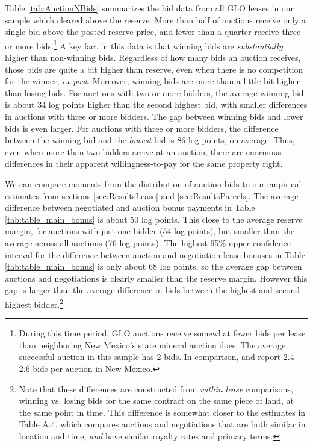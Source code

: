 \documentclass[12pt]{article}
\newcommand{\inputy}[1]{\unskip}
\begin{document}
Table \ref{tab:AuctionNBids} summarizes the bid data from all \inputy{../output/estimates/tract_date_leased_insample.tex} GLO leases in our sample which cleared above the reserve. More than half of auctions receive only a single bid above the posted reserve price, and fewer than a quarter receive three or more bids.\footnote{During this time period, GLO auctions receive somewhat fewer bids per lease than neighboring New Mexico's state mineral auction does. The average successful auction in this sample has 2 bids.  In comparison, \cite{bhattacharya2018bidding} and \cite{kong_selective_2017} report 2.4 - 2.6 bids per auction in New Mexico.}  A key fact in this data is that winning bids are \textit{substantially} higher than non-winning bids.  Regardless of how many bids an auction receives, those bids are quite a bit higher than reserve, even when there is no competition for the winner, \textit{ex post}.  Moreover, winning bids are more than a little bit higher than losing bids.  For auctions with two or more bidders, the average winning bid is about 34 log points higher than the second highest bid, with smaller differences in auctions with three or more bidders.  The gap between winning bids and lower bids is even larger.  For auctions with three or more bidders, the difference between the winning bid and the \textit{lowest} bid is 86 log points, on average.  Thus, even when more than two bidders arrive at an auction, there are enormous differences in their apparent willingness-to-pay for the same property right. 

We can compare moments from the distribution of auction bids to our empirical estimates from sections \ref{sec:ResultsLease} and \ref{sec:ResultsParcels}. The average difference between negotiated and auction bonus payments in Table \ref{tab:table_main_bonus} is about 50 log points. This close to the average reserve margin, for auctions with just one bidder (54 log points), but smaller than the average across all auctions (76 log points). The highest 95\% upper confidence interval for the difference between auction and negotiation lease bonuses in Table \ref{tab:table_main_bonus} is only about 68 log points, so the average gap between auctions and negotiations is clearly smaller than the reserve margin. However this gap is larger than the average difference in bids between the highest and second highest bidder.\footnote{Note that these differences are constructed from \textit{within lease} comparisons, winning vs. losing bids for the same contract on the same piece of land, at the same point in time.  This difference is somewhat closer to the estimates in Table A.4, which compares auctions and negotiations that are both similar in location and time, \textit{and} have similar royalty rates and primary terms.} 
\end{document}

